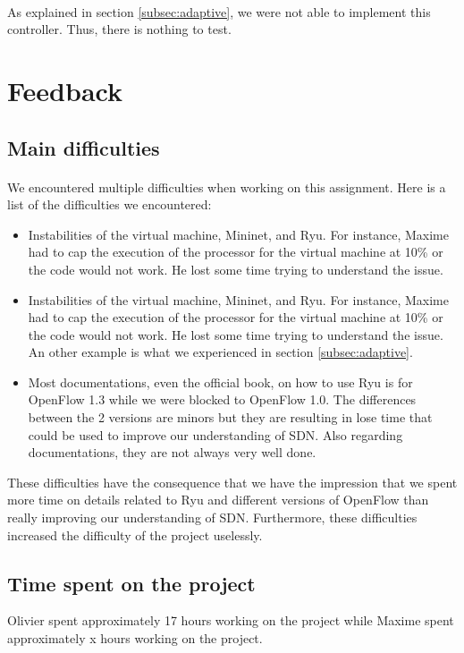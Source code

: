 \documentclass[a4paper, 11pt, oneside]{article}
\begin{document}
\begin{table}[H]
\paragraph{}As explained in section \ref{subsec:adaptive}, we were not able to implement this controller. Thus, there is nothing to test.


\section{Feedback} \label{sec:feedback}
\subsection{Main difficulties}
\paragraph{}We encountered multiple difficulties when working on this assignment. Here is a list of the difficulties we encountered:
\begin{itemize}
\item Instabilities of the virtual machine, Mininet, and Ryu. For instance, Maxime had to cap the execution of the processor for the virtual machine at 10\% or the code would not work. He lost some time trying to understand the issue.
\item Instabilities of the virtual machine, Mininet, and Ryu. For instance, Maxime had to cap the execution of the processor for the virtual machine at 10\% or the code would not work. He lost some time trying to understand the issue. An other example is what we experienced in section \ref{subsec:adaptive}.
\item Most documentations, even the official book, on how to use Ryu is for OpenFlow 1.3 while we were blocked to OpenFlow 1.0. The differences between the 2 versions are minors but they are resulting in lose time that could be used to improve our understanding of SDN. Also regarding documentations, they are not always very well done.
\end{itemize}
These difficulties have the consequence that we have the impression that we spent more time on details related to Ryu and different versions of OpenFlow than really improving our understanding of SDN. Furthermore, these difficulties increased the difficulty of the project uselessly.

\subsection{Time spent on the project}
Olivier spent approximately 17 hours working on the project while Maxime spent approximately x hours working on the project.


\end{table}
\end{document}

